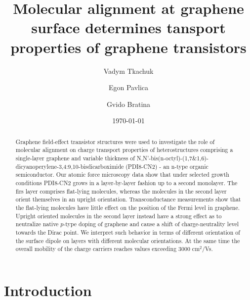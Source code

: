 \documentclass[preprint,aip,jap]{revtex4-2}
\begin{document}
\title{Molecular alignment at graphene surface determines tansport properties of graphene transistors}

\author{Vadym Tkachuk}%
\author{Egon Pavlica}%
\author{Gvido Bratina}%
%
\date{\today}

\begin{abstract}

  Graphene field-effect transistor structures were used to investigate the role of molecular alignment on charge transport properties of heterostructures comprising a single-layer graphene and variable thickness of N,N'-bis(n-octyl)-(1,7\&1,6)-dicyanoperylene-3,4:9,10-bisdicarboximide (PDI8-CN2) - an n-type organic semiconductor. Our atomic force microscopy data show that under selected growth conditions PDI8-CN2 grows in a layer-by-layer fashion up to a second monolayer. The firs layer comprises flat-lying molecules, whereas the molecules in the second layer orient themselves in an upright orientation. Transconductance measurements show that the flat-lying molecules have little effect on the position of the Fermi level in graphene. Upright oriented molecules in the second layer instead have a strong effect as to neutralize native $p$-type doping of graphene and cause a shift of charge-neutrality level towards the Dirac point. We interpret such behavior in terms of different orientation of the surface dipole on layers with different molecular orientations. At the same time the overall mobility of the charge carriers reaches values exceeding 3000 cm$^{2}$/Vs.  
\end{abstract}


\maketitle

\section{\label{sec:intro}Introduction}
\end{document}
